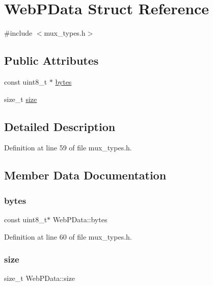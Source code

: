 \hypertarget{struct_web_p_data}{}\section{Web\+P\+Data Struct Reference}
\label{struct_web_p_data}


{\ttfamily \#include $<$mux\+\_\+types.\+h$>$}

\subsection*{Public Attributes}
\begin{DoxyCompactItemize}
\item 
const uint8\+\_\+t $\ast$ \mbox{\hyperlink{struct_web_p_data_a9f2da1eaf041fac4640b34555ddc6ec1}{bytes}}
\item 
size\+\_\+t \mbox{\hyperlink{struct_web_p_data_ac99182026a1b7c8ed7811348b5d62707}{size}}
\end{DoxyCompactItemize}


\subsection{Detailed Description}


Definition at line 59 of file mux\+\_\+types.\+h.



\subsection{Member Data Documentation}
\mbox{\label{struct_web_p_data_a9f2da1eaf041fac4640b34555ddc6ec1}} 
\subsubsection{\texorpdfstring{bytes}{bytes}}
{\footnotesize\ttfamily const uint8\+\_\+t$\ast$ Web\+P\+Data\+::bytes}



Definition at line 60 of file mux\+\_\+types.\+h.

\mbox{\label{struct_web_p_data_ac99182026a1b7c8ed7811348b5d62707}} 
\subsubsection{\texorpdfstring{size}{size}}
{\footnotesize\ttfamily size\+\_\+t Web\+P\+Data\+::size}



